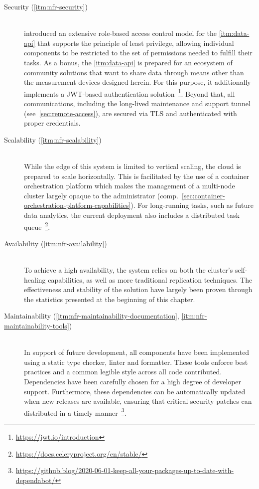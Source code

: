 \begin{description}
  \item[Security (\ref{itm:nfr-security})]
  \hfill \\
   introduced an extensive role-based access control model for the \ref{itm:data-api} that supports the principle of least privilege, allowing individual components to be restricted to the set of permissions needed to fulfill their tasks. As a bonus, the \ref{itm:data-api} is prepared for an ecosystem of community solutions that want to share data through means other than the measurement devices designed herein. For this purpose, it additionally implements a \acs{JWT}-based authentication solution~\footnote{\url{https://jwt.io/introduction}}. Beyond that, all communications, including the long-lived maintenance and support tunnel (see~\autoref{sec:remote-access}), are secured via \acs{TLS} and authenticated with proper credentials. 
  
  \item[Scalability (\ref{itm:nfr-scalability})]
  \hfill \\
  While the edge of this system is limited to vertical scaling, the cloud is prepared to scale horizontally. This is facilitated by the use of a container orchestration platform which makes the management of a multi-node cluster largely opaque to the administrator (comp.~\autoref{sec:container-orchestration-platform-capabilities}). For long-running tasks, such as future data analytics, the current deployment also includes a distributed task queue~\footnote{\url{https://docs.celeryproject.org/en/stable/}}.
 
  \item[Availability (\ref{itm:nfr-availability})]
  \hfill \\
  To achieve a high availability, the system relies on both the cluster's self-healing capabilities, as well as more traditional replication techniques. The effectiveness and stability of the solution have largely been proven through the statistics presented at the beginning of this chapter.
  
  \item[Maintainability (\ref{itm:nfr-maintainability-documentation}, \ref{itm:nfr-maintainability-tools})]
  \hfill \\
  In support of future development, all components have been implemented using a static type checker, linter and formatter. These tools enforce best practices and a common legible style across all code contributed. Dependencies have been carefully chosen for a high degree of developer support. Furthermore, these dependencies can be automatically updated when new releases are available, ensuring that critical security patches can distributed in a timely manner~\footnote{\url{https://github.blog/2020-06-01-keep-all-your-packages-up-to-date-with-dependabot/}}.
    

\end{description}
